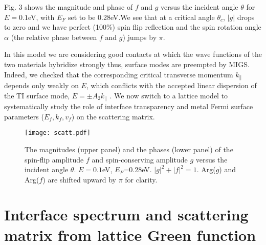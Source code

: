 \documentclass[12pt,twocolumn]{article}
\begin{document}
Fig. 3 shows the magnitude and phase of $f$ and $g$ versus the incident angle $\theta$ for $E=0.1$eV, with $E_F$ set to be 0.28eV.We see that at a critical angle $\theta_c$, $|g|$ drops to zero and we have perfect (100\%) spin flip reflection and the spin rotation angle $\alpha$ (the relative phase between $f$ and $g$)
jumps by $\pi$.

In this model we are considering good contacts at which the wave functions of the two materials hybridize strongly thus, surface modes are preempted by MIGS. Indeed, we checked that the corresponding critical 
transverse momentum $k_\parallel$ depends only weakly on $E$, which conflicts with the accepted linear dispersion of the TI surface mode, $E=\pm A_2k_\parallel$ \cite{zhang2009}. We now switch to a lattice model to systematically study the role of interface transparency and metal Fermi surface parameters ($E_f, k_f, v_f$) on the scattering matrix. 



\begin{figure}
\texttt{[image: scatt.pdf]}
\caption{ The magnitudes (upper panel) and the phases (lower panel) of the spin-flip 
amplitude $f$ and spin-conserving amplitude $g$ versus the incident angle $\theta$.
$E=0.1$eV, $E_F$=0.28eV. $|g|^2+|f|^2=1$. Arg($g$) and Arg($f$) 
are shifted upward by $\pi$ for clarity.}
\end{figure}

\section{Interface spectrum and scattering matrix from lattice Green function} 
\end{document}
